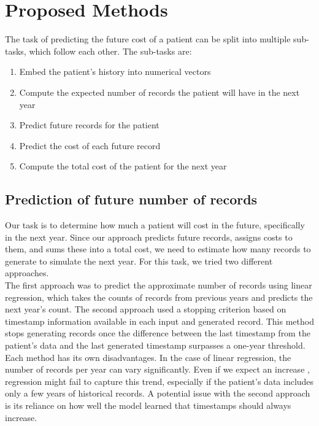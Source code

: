 
\chapter{Proposed Methods}
\label{propMet}

The task of predicting the future cost of a patient can be split into multiple sub-tasks, which follow each other. The sub-tasks are:

\begin{enumerate}
	\item Embed the patient’s history into numerical vectors
	\item Compute the expected number of records the patient will have in the next year
	\item Predict future records for the patient
	\item Predict the cost of each future record
	\item Compute the total cost of the patient for the next year
\end{enumerate}




\section{Prediction of future number of records}

Our task is to determine how much a patient will cost in the future, specifically in the next year. Since our approach predicts future records, assigns costs to them, and sums these into a total cost, we need to estimate how many records to generate to simulate the next year. For this task, we tried two different approaches.
\\

The first approach was to predict the approximate number of records using linear regression, which takes the counts of records from previous years and predicts the next year’s count. The second approach used a stopping criterion based on timestamp information available in each input and generated record. This method stops generating records once the difference between the last timestamp from the patient’s data and the last generated timestamp surpasses a one-year threshold.
\\

Each method has its own disadvantages. In the case of linear regression, the number of records per year can vary significantly. Even if we expect an increase \cite{num_of_vis}, regression might fail to capture this trend, especially if the patient’s data includes only a few years of historical records. A potential issue with the second approach is its reliance on how well the model learned that timestamps should always increase.

